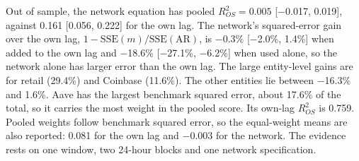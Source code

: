 \documentclass[referee,pdflatex,sn-mathphys-ay]{sn-jnl}
\theoremstyle{thmstyleone}%
\theoremstyle{thmstyletwo}%
\theoremstyle{thmstylethree}%
\begin{document}
Out of sample, the network equation has pooled $R^2_{OS}=0.005$ [$-$0.017, 0.019], against
0.161 [0.056, 0.222] for the own lag. The network's squared-error gain over the own lag, $1-\mathrm{SSE}(m)/\mathrm{SSE}(\mathrm{AR})$, is $-$0.3\% [$-$2.0\%, 1.4\%] when added to the own lag and
$-$18.6\% [$-$27.1\%, $-$6.2\%] when used alone, so the network alone has larger error than the own lag. The large entity-level gains are for retail
(29.4\%) and Coinbase (11.6\%). The other entities lie between
$-$16.3\% and 1.6\%. Aave has the largest benchmark squared error, about 17.6\% of
the total, so it carries the most weight in the pooled score. Its own-lag $R^2_{OS}$ is 0.759. Pooled weights
follow benchmark squared error, so the equal-weight means are also reported: 0.081 for the own lag and
$-$0.003 for the network. The evidence rests on one window, two 24-hour blocks and one network specification.
\end{document}
